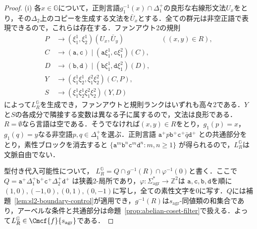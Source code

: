 \begin{proof}
(i) 各$x\in {\mathbb G}$について，正則言語$g_1^{-1}(x)\cap\Delta_1^+$の良形な右線形文法$U_x$をとり，その$\Delta_2$上のコピーを生成する文法を$\bar U_x$とする．全ての群元は非空正語で表現できるので，これらは存在する．ファンアウト2の規則
\[
\begin{aligned}
 P&\to(\xi_1^1,\xi_2^1)(U_x,\bar U_y) &&((x,y)\in R),\\
 C&\to(\mathtt a,\mathtt c)
      \mid(\mathtt a\xi_1^1,\mathtt c\xi_1^2)(C),\\
 D&\to(\mathtt b,\mathtt d)
      \mid(\mathtt b\xi_1^1,\mathtt d\xi_1^2)(D),\\
 Y&\to(\xi_1^1\xi_2^1,\xi_1^2\xi_2^2)(C,P),\\
 S&\to(\xi_1^1\xi_2^1\xi_1^2\xi_2^2)(Y,D)
\end{aligned}
\]
によって$L_R^{\mathbb G}$を生成でき，ファンアウトと規則ランクはいずれも高々2である．$Y$と$S$の各成分で隣接する変数は異なる子に属するので，文法は良形である．$R=\emptyset$なら言語は空である．そうでなければ$(x,y)\in R$をとり，$g_1(p)=x$，$g_1(q)=y$なる非空語$p,q\in\Delta_1^+$を選ぶ．正則言語
$\mathtt a^+p\mathtt b^+\mathtt c^+\bar q\mathtt d^+$
との共通部分をとり，素性ブロックを消去すると
$\{\mathtt a^m\mathtt b^n\mathtt c^m\mathtt d^n:m,n\ge1\}$
が得られるので，$L_R^{\mathbb G}$は文脈自由でない．

型付き代入可能性について，
$L_R^{\mathbb G}=Q\cap g^{-1}(R)\cap\varphi^{-1}(0)$と書く．ここで
$Q=\mathtt a^+\Delta_1^+\mathtt b^+\mathtt c^+\Delta_2^+\mathtt d^+$
は狭義2-局所であり，$\varphi:\Sigma_{\mathrm{agr}}^*\to\mathbb Z^2$は
$\mathtt a,\mathtt c,\mathtt b,\mathtt d$を順に
$(1,0),(-1,0),(0,1),(0,-1)$に写し，全ての素性文字を$0$に写す．$Q$には補題~\ref{lem:sl2-boundary-control}が適用でき，$g^{-1}(R)$は$s_{\mathrm{agr}}$-同値類の和集合であり，アーベルな条件と共通部分は命題~\ref{prop:abelian-coset-filter}で扱える．よって$L_R^{\mathbb G}\in\Cmcf{f}{s_{\mathrm{agr}}}$である．


\end{proof}
